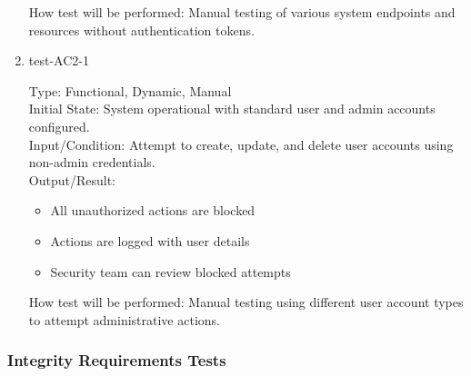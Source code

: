 \documentclass[12pt, titlepage]{article}
\begin{document}
\begin{enumerate}
    How test will be performed: Manual testing of various system endpoints and resources without authentication tokens.

    \item{test-AC2-1\\}  \label{test-AC2-1}
    
    Type: Functional, Dynamic, Manual\\
    
    Initial State: System operational with standard user and admin accounts configured.\\
    
    Input/Condition: Attempt to create, update, and delete user accounts using non-admin credentials.\\
    
    Output/Result:
    \begin{itemize}
        \item All unauthorized actions are blocked
        \item Actions are logged with user details
        \item Security team can review blocked attempts
    \end{itemize}
    
    How test will be performed: Manual testing using different user account types to attempt administrative actions.
\end{enumerate}


\subsubsection{Integrity Requirements Tests} \label{section:4.3.2}
\end{document}
